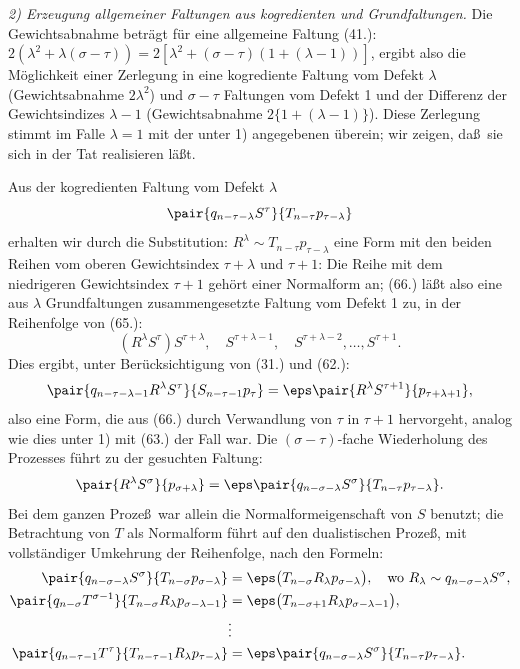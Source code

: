 \emph{2) Erzeugung allgemeiner Faltungen aus kogredienten und Grundfaltungen.} Die Gewichtsabnahme betr\"agt f\"ur eine allgemeine Faltung (41.): $2(\lambda^2+\lambda(\sigma-\tau))=2[\lambda^2+(\sigma-\tau)(1+(\lambda-1))]$, ergibt also die M\"oglichkeit einer Zerlegung in eine kogrediente Faltung vom Defekt $\lambda$ (Gewichtsabnahme $2\lambda^2$) und $\sigma-\tau$ Faltungen vom Defekt 1 und der Differenz der Gewichtsindizes $\lambda-1$ (Gewichtsabnahme $2\{1+(\lambda-1)\}$). Diese Zerlegung stimmt im Falle $\lambda=1$ mit der unter 1) angegebenen \"uberein; wir zeigen, da\ss\ sie sich in der Tat realisieren l\"a\ss t.

Aus der kogredienten Faltung vom Defekt $\lambda$
\[
 \pair{q_{n-\tau-\lambda}S^\tau}{T_{n-\tau}p_{\tau-\lambda}}
\]
erhalten wir durch die Substitution: $R^\lambda\sim T_{n-\tau}p_{\tau-\lambda}$ eine Form mit den beiden Reihen vom oberen Gewichtsindex $\tau+\lambda$ und $\tau+1$:
Die Reihe mit dem niedrigeren Gewichtsindex $\tau+1$ geh\"ort einer Normalform an; (66.) l\"a\ss t also eine aus $\lambda$ Grundfaltungen zusammengesetzte Faltung vom Defekt 1 zu, in der Reihenfolge von (65.):
\[
 (R^\lambda S^\tau)S^{\tau+\lambda},\quad S^{\tau+\lambda-1},\quad S^{\tau+\lambda-2},\ldots,S^{\tau+1}.
\]
Dies ergibt, unter Ber\"ucksichtigung von (31.) und (62.):
\[
 \pair{q_{n-\tau-\lambda-1}R^\lambda S^\tau}{S_{n-\tau-1}p_\tau}=\eps\pair{R^\lambda S^{\tau+1}}{p_{\tau+\lambda+1}},
\]
also eine Form, die aus (66.) durch Verwandlung von $\tau$ in $\tau+1$ hervorgeht, analog wie dies unter 1) mit (63.) der Fall war. Die $(\sigma-\tau)$-fache Wiederholung des Prozesses f\"uhrt zu der gesuchten Faltung:
\[
 \pair{R^\lambda S^\sigma}{p_{\sigma+\lambda}}=\eps\pair{q_{n-\sigma-\lambda}S^\sigma}{T_{n-\tau}p_{\tau-\lambda}}.
\]
Bei dem ganzen Proze\ss\ war allein die Normalformeigenschaft von $S$ benutzt; die Betrachtung von $T$ als Normalform f\"uhrt auf den dualistischen Proze\ss, mit vollst\"andiger Umkehrung der Reihenfolge, nach den Formeln:
\begin{align*}
\pair{q_{n-\sigma-\lambda}S^\sigma}{T_{n-\sigma}p_{\sigma-\lambda}}&=\eps\bigl(T_{n-\sigma}R_\lambda p_{\sigma-\lambda}\bigr),\quad \text{wo }R_\lambda\sim q_{n-\sigma-\lambda}S^\sigma,\\
\pair{q_{n-\sigma}T^{\sigma-1}}{T_{n-\sigma}R_\lambda p_{\sigma-\lambda-1}}&=\eps\bigl(T_{n-\sigma+1}R_\lambda p_{\sigma-\lambda-1}\bigr),\\
&\vdots\\
\pair{q_{n-\tau-1}T^\tau}{T_{n-\tau-1}R_\lambda p_{\tau-\lambda}}&=\eps\pair{q_{n-\sigma-\lambda}S^\sigma}{T_{n-\tau}p_{\tau-\lambda}}.
\end{align*}
